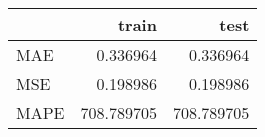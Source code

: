 \begin{tabular}{lrr}
\toprule
{} &       train &        test \\
\midrule
MAE  &    0.336964 &    0.336964 \\
MSE  &    0.198986 &    0.198986 \\
MAPE &  708.789705 &  708.789705 \\
\bottomrule
\end{tabular}
